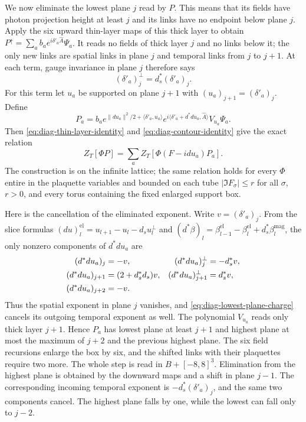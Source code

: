\documentclass[11pt,letterpaper,reqno]{amsart}
\begin{document}
We now eliminate the lowest plane $j$ read by $P$. This means
that its fields have photon projection height at least $j$
and its links have no endpoint below plane $j$. Apply the
six upward thin-layer maps of this thick layer to obtain
$P^\uparrow=\sum_a b_a e^{i\delta'_a\widehat A}\Psi_a$.
It reads no fields of thick layer $j$ and no links below it;
the only new links are spatial links in plane $j$ and temporal
links from $j$ to $j+1$. At each term, gauge invariance in
plane $j$ therefore says
\begin{equation}\label{eq:diag-lowest-plane-charge}
 (\delta'_a)^\perp_j=d_s^*(\delta'_a)_j.
\end{equation}
For this term let $u_a$ be supported on plane $j+1$ with
$(u_a)_{j+1}=(\delta'_a)_j$. Define
\begin{equation}\label{eq:diag-outer-polynomial}
 P_a=b_a e^{\|du_a\|^2/2+\langle\delta'_a,u_a\rangle}
       e^{i\langle\delta'_a+d^*du_a,\widehat A\rangle}
                                    V_{u_a}\Psi_a.
\end{equation}
Then \eqref{eq:diag-thin-layer-identity} and
\eqref{eq:diag-contour-identity} give the exact relation
\begin{equation}\label{eq:diag-outer-identity}
 Z_T[\Phi P]=\sum_a Z_T[\Phi(F-idu_a)P_a].
\end{equation}
The construction is on the infinite lattice; the same relation
holds for every $\Phi$ entire in the plaquette variables and
bounded on each tube $|\Im F_\sigma|\le r$ for all $\sigma$,
$r>0$, and every torus containing the fixed enlarged support box.

Here is the cancellation of the eliminated exponent. Write
$v=(\delta'_a)_j$. From the slice formulas
$(du)^{\mathrm{el}}_l=u_{l+1}-u_l-d_su_l^\perp$ and
$(d^*\beta)_l=\beta^{\mathrm{el}}_{l-1}
-\beta^{\mathrm{el}}_l+d_s^*\beta^{\mathrm{mag}}_l$, the only
nonzero components of $d^*du_a$ are
\begin{align}\label{eq:diag-outer-cancellation}
 (d^*du_a)_j&=-v,&(d^*du_a)^\perp_j&=-d_s^*v,\notag\\
 (d^*du_a)_{j+1}&=(2+d_s^*d_s)v,
       &(d^*du_a)^\perp_{j+1}&=d_s^*v,\notag\\
 (d^*du_a)_{j+2}&=-v.
\end{align}
Thus the spatial exponent in plane $j$ vanishes, and
\eqref{eq:diag-lowest-plane-charge} cancels its outgoing
temporal exponent as well. The polynomial $V_{u_a}$ reads
only thick layer $j+1$. Hence $P_a$ has lowest plane at
least $j+1$ and highest plane at most the maximum of $j+2$
and the previous highest plane. The six field recursions
enlarge the box by six, and the shifted links with their
plaquettes require two more. The whole step is read in
$B+[-8,8]^3$. Elimination from the highest plane is obtained
by the downward maps and a shift in plane $j-1$. The corresponding
incoming temporal exponent is
$-d_s^*(\delta'_a)_j$, and the same two components cancel.
The highest plane falls by one, while the lowest can fall
only to $j-2$.
\end{document}
